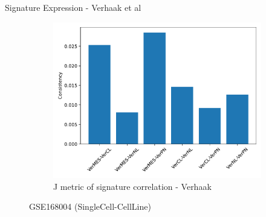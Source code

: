 \documentclass[aspectratio=169,9pt]{beamer}
\begin{document}
\begin{frame}{Signature Expression - Verhaak et al}
\begin{adjustwidth}{-5cm}{-5cm}
\begin{figure}
\begin{subfigure}[c]{0.4\textwidth}
                    \includegraphics[width=\textwidth]{celllines_Consistency_Ver}
                    \caption{J metric of signature correlation - Verhaak}
                \end{subfigure}
                \caption{GSE168004 (SingleCell-CellLine)}
            \end{figure}
        \end{adjustwidth}
    \end{frame}
\end{document}
